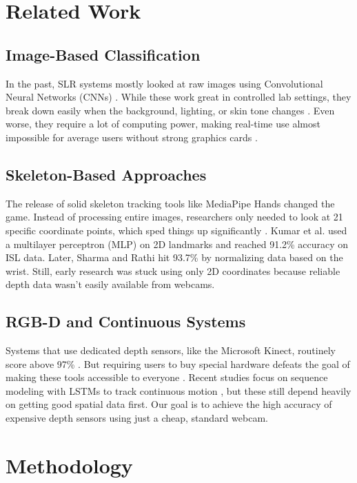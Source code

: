 \documentclass[conference]{IEEEtran}
\begin{document}
\section{\textbf{Related Work}}

\subsection{\textbf{Image-Based Classification}}
In the past, SLR systems mostly looked at raw images using Convolutional Neural Networks (CNNs) \cite{elakkiya2021, koller2016, garcia2016}. While these work great in controlled lab settings, they break down easily when the background, lighting, or skin tone changes \cite{pigou2014}. Even worse, they require a lot of computing power, making real-time use almost impossible for average users without strong graphics cards \cite{cao2017}.

\subsection{\textbf{Skeleton-Based Approaches}}
The release of solid skeleton tracking tools like MediaPipe Hands \cite{zhang2020} changed the game. Instead of processing entire images, researchers only needed to look at 21 specific coordinate points, which sped things up significantly \cite{cooper2011}. Kumar et al. \cite{kumar2022} used a multilayer perceptron (MLP) on 2D landmarks and reached 91.2\% accuracy on ISL data. Later, Sharma and Rathi \cite{sharma2023} hit 93.7\% by normalizing data based on the wrist. Still, early research was stuck using only 2D coordinates because reliable depth data wasn't easily available from webcams.

\subsection{\textbf{RGB-D and Continuous Systems}}
Systems that use dedicated depth sensors, like the Microsoft Kinect, routinely score above 97\% \cite{gupta2023}. But requiring users to buy special hardware defeats the goal of making these tools accessible to everyone \cite{camgoz2018}. Recent studies focus on sequence modeling with LSTMs to track continuous motion \cite{pu2019, halder2020}, but these still depend heavily on getting good spatial data first. Our goal is to achieve the high accuracy of expensive depth sensors using just a cheap, standard webcam.

\section{\textbf{Methodology}}
\end{document}
